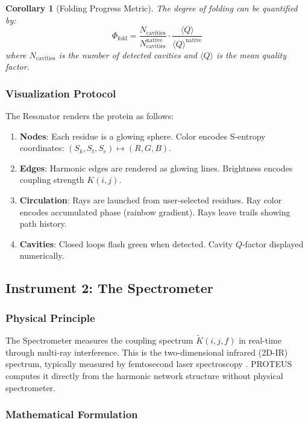 \documentclass[11pt,a4paper]{article}
\newtheorem{corollary}[theorem]{Corollary}
\begin{document}
\begin{corollary}[Folding Progress Metric]
The degree of folding can be quantified by:
\begin{equation}
\Phi_{\text{fold}} = \frac{N_{\text{cavities}}}{N_{\text{cavities}}^{\text{native}}} \cdot \frac{\langle Q \rangle}{\langle Q \rangle^{\text{native}}}
\end{equation}
where $N_{\text{cavities}}$ is the number of detected cavities and $\langle Q \rangle$ is the mean quality factor.
\end{corollary}

\subsubsection{Visualization Protocol}

The Resonator renders the protein as follows:
\begin{enumerate}
\item \textbf{Nodes}: Each residue is a glowing sphere. Color encodes S-entropy coordinates: $(S_k, S_t, S_e) \mapsto (R, G, B)$.
\item \textbf{Edges}: Harmonic edges are rendered as glowing lines. Brightness encodes coupling strength $K(i,j)$.
\item \textbf{Circulation}: Rays are launched from user-selected residues. Ray color encodes accumulated phase (rainbow gradient). Rays leave trails showing path history.
\item \textbf{Cavities}: Closed loops flash green when detected. Cavity $Q$-factor displayed numerically.
\end{enumerate}

\subsection{Instrument 2: The Spectrometer}

\subsubsection{Physical Principle}

The Spectrometer measures the coupling spectrum $\tilde{K}(i,j,f)$ in real-time through multi-ray interference. This is the two-dimensional infrared (2D-IR) spectrum, typically measured by femtosecond laser spectroscopy \cite{Hamm2011}. PROTEUS computes it directly from the harmonic network structure without physical spectrometer.

\subsubsection{Mathematical Formulation}
\end{document}
